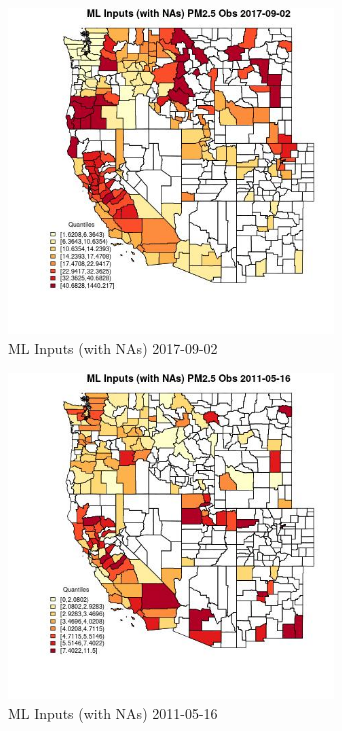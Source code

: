 \begin{figure} 
\centering  
\includegraphics[width=0.77\textwidth]{Code_Outputs/Report_ML_input_PM25_Step4_part_e_de_duplicated_aveswNAs_CountyPM25_ObsMean2017-09-02_2017-09-02.jpg} 
\caption{\label{fig:Report_ML_input_PM25_Step4_part_e_de_duplicated_aveswNAsCountyPM25_ObsMean2017-09-02_2017-09-02}ML Inputs (with NAs) 2017-09-02} 
\end{figure} 
 

\begin{figure} 
\centering  
\includegraphics[width=0.77\textwidth]{Code_Outputs/Report_ML_input_PM25_Step4_part_e_de_duplicated_aveswNAs_CountyPM25_ObsMean2011-05-16_2011-05-16.jpg} 
\caption{\label{fig:Report_ML_input_PM25_Step4_part_e_de_duplicated_aveswNAsCountyPM25_ObsMean2011-05-16_2011-05-16}ML Inputs (with NAs) 2011-05-16} 
\end{figure} 
 

